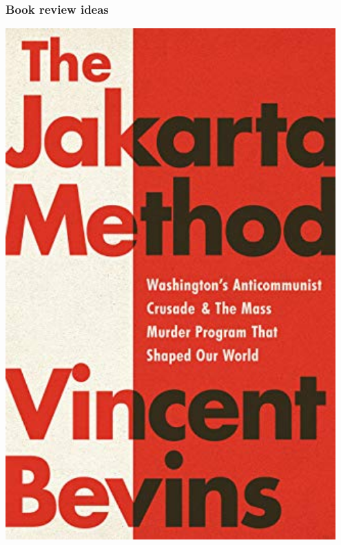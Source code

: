 \documentclass[aspectratio=43]{beamer}
\begin{document}
\begin{frame}
\frametitle{Book review ideas}
\centering

\begin{minipage}{0.45\textwidth}\centering
\includegraphics[width = 0.95\textwidth]{img/jakarta_bevins}
\end{minipage}\hfill
\begin{minipage}{0.45\textwidth}\centering

\end{minipage}
\end{frame}
\end{document}

